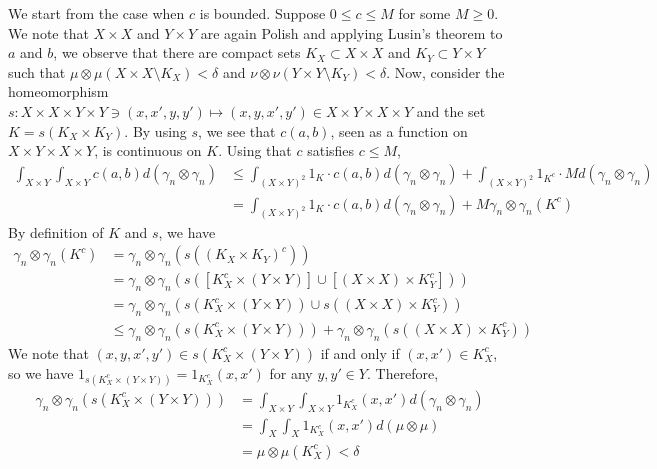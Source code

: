 \documentclass[twoside,11pt]{article}
\theoremstyle{definition}
\begin{document}
    We start from the case when $c$ is bounded. Suppose $0\leq c\leq M$ for some $M\geq 0$. We note that $X\times X$ and $Y\times Y$ are again Polish and applying Lusin's theorem to $a$ and $b$, we observe that there are compact sets $K_X\subset X\times X$ and $K_Y\subset Y\times Y$ such that $\mu\otimes \mu(X\times X \setminus K_X)<\delta$ and $\nu\otimes \nu(Y\times Y \setminus K_Y)<\delta$. Now, consider the homeomorphism $s:X\times X\times Y\times Y\ni (x,x',y,y') \mapsto (x,y,x',y')\in X\times Y \times X\times Y$ and the set $K = s(K_X\times K_Y)$. By using $s$, we see that $c(a,b)$, seen as a function on $X\times Y\times X\times Y$, is continuous on $K$. Using that $c$ satisfies $c\leq M$,
    \begin{align}
        \int_{X\times Y}\int_{X\times Y}c(a,b)d(\gamma_n\otimes \gamma_n) & \leq  \int_{(X\times Y)^2}1_{K}\cdot c(a,b)d(\gamma_n\otimes \gamma_n) + \int_{(X\times Y)^2}1_{K^c}\cdot Md(\gamma_n\otimes \gamma_n) \\  &=\int_{(X\times Y)^2}1_{K}\cdot c(a,b)d(\gamma_n\otimes \gamma_n) +M \gamma_n\otimes \gamma_n(K^c)
    \end{align}
    By definition of $K$ and $s$, we have
    \begin{align}
        \gamma_n\otimes \gamma_n(K^c) & = \gamma_n\otimes \gamma_n(s((K_X\times K_Y)^c)) \\ &=\gamma_n\otimes \gamma_n(s([K_X^c\times (Y\times Y)]\cup [(X\times X)\times K_Y^c] )) \\ &= \gamma_n\otimes \gamma_n (s(K_X^c\times (Y\times Y))\cup s((X\times X) \times K_Y^c)) \\ &\leq \gamma_n\otimes \gamma_n(s(K_X^c\times (Y\times Y))) + \gamma_n\otimes \gamma_n (s((X\times X)\times K_Y^c))
    \end{align}
    We note that $(x,y,x',y')\in s(K_X^c\times (Y\times Y))$ if and only if $(x,x')\in K_X^c$, so we have $1_{s(K_X^c\times (Y\times Y))}=1_{K_X^c}(x,x')$ for any $y,y'\in Y$. Therefore,
    \begin{align}
        \gamma_n\otimes \gamma_n(s(K_X^c\times (Y\times Y))) & = \int_{X\times Y}\int_{X\times Y} 1_{K_X^c}(x,x')d(\gamma_n\otimes \gamma_n) \\
                                                             & = \int_{X}\int_{X} 1_{K_X^c}(x,x')d(\mu\otimes \mu)                            \\
                                                             & = \mu\otimes \mu(K_X^c) < \delta
    \end{align}
\end{document}
